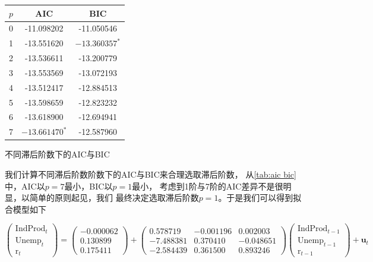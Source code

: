 \documentclass[cn]{homework}
\begin{document}
    \begin{margintable}
        \centering
        \begin{tabular}{ccc}
            \toprule
            $p$ & AIC  & BIC \\
            \midrule
            0 & -11.098202& -11.050546\\
            1 & -13.551620& $-13.360357^*$ \\
            2 & -13.536611& -13.200779\\
            3 & -13.553569& -13.072193\\
            4 & -13.512417& -12.884513\\
            5 & -13.598659& -12.823232\\
            6 & -13.618900& -12.694941\\
            7 & $-13.661470^*$ & -12.587960\\
            \bottomrule
        \end{tabular}
        \caption{不同滞后阶数下的AIC与BIC}
        \label{tab:aic bic}
    \end{margintable}
    我们计算不同滞后阶数阶数下的AIC与BIC来合理选取滞后阶数，
    从\cref{tab:aic bic}中，AIC以$p=7$最小，BIC以$p=1$最小，
    考虑到1阶与7阶的AIC差异不是很明显，以简单的原则起见，我们
    最终决定选取滞后阶数$p=1$。于是我们可以得到拟合模型如下
    \begin{fullwidth}
    \def\ind{\text{IndProd}}
    \def\une{\text{Unemp}}
    \def\rrr{\text{r}}
    \[\begin{pmatrix}
        \ind_t\\
        \une_t\\
        \rrr_t
    \end{pmatrix}
    =\begin{pmatrix}
        -0.000062\\
        0.130899\\
        0.175411
    \end{pmatrix}
    +\begin{pmatrix}
        0.578719 & -0.001196 & 0.002003\\
        -7.488381 & 0.370410 & -0.048651\\
        -2.584439 & 0.361500 & 0.893246
    \end{pmatrix}
    \begin{pmatrix}
        \ind_{t-1}\\
        \une_{t-1}\\
        \rrr_{t-1}
    \end{pmatrix}+\boldsymbol u_t\]
    \end{fullwidth}
\end{document}
